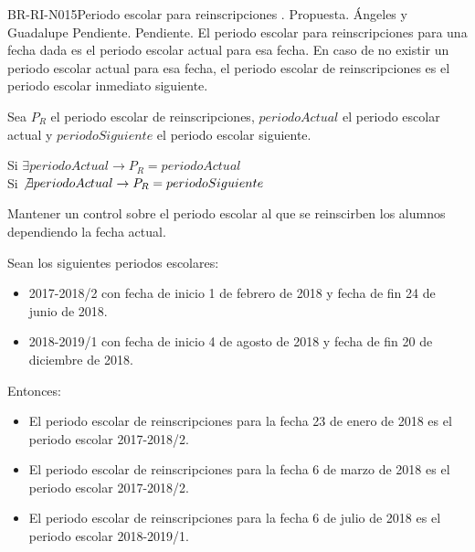 \begin{BusinessRule}{BR-RI-N015}{Periodo escolar para reinscripciones}
	{\bcCondition}   %
	{\btEnabler}   %
	{\blControlling}   %
	.
	\BRItem[Estado] Propuesta.
	 Ángeles y Guadalupe
	 Pendiente.
	 Pendiente.
	\BRItem[Descripción] El periodo escolar para reinscripciones para una fecha dada es el periodo escolar actual para esa fecha. En caso de no existir un periodo escolar actual para esa fecha, el periodo escolar de reinscripciones es el periodo escolar inmediato siguiente.

	\BRItem[Sentencia] Sea $P_{R}$ el periodo escolar de reinscripciones, $periodoActual$ el periodo escolar actual y $periodoSiguiente$ el periodo escolar siguiente.
	
	Si $ \exists periodoActual \rightarrow P_{R} = periodoActual$\\
	Si $ \not \exists periodoActual \rightarrow P_{R} = periodoSiguiente$
	

	\BRItem[Motivación] Mantener un control sobre el periodo escolar al que se reinscirben los alumnos dependiendo la fecha actual.
	
	\BRItem[Ejemplo:] Sean los siguientes periodos escolares:
	
	\begin{itemize}
		\item 2017-2018/2 con fecha de inicio 1 de febrero de 2018 y fecha de fin 24 de junio de 2018.
		\item 2018-2019/1 con fecha de inicio 4 de agosto de 2018 y fecha de fin 20 de diciembre de 2018.
	\end{itemize}

	Entonces:
	\begin{itemize}
		\item El periodo escolar de reinscripciones para la fecha 23 de enero de 2018 es el periodo escolar 2017-2018/2.
		\item El periodo escolar de reinscripciones para la fecha 6 de marzo de 2018 es el periodo escolar 2017-2018/2.
		\item El periodo escolar de reinscripciones para la fecha 6 de julio de 2018 es el periodo escolar 2018-2019/1.
	\end{itemize}
		

\end{BusinessRule}
